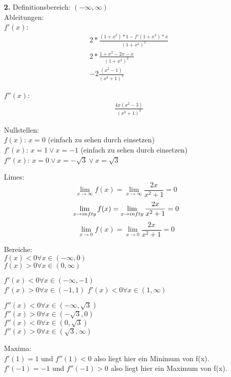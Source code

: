 \documentclass[a4paper]{scrartcl}
\title{\titleinfo}
\author{Elena Noll, Sven-Hendrik Haase, Arne Struck}
\date{\today}
\begin{document}
\maketitle

\begin{enumerate}

\item[\textbf{2.}]
Definitionsbereich: \((-\infty,\infty)\)\\
Ableitungen:\\

\(f'(x)\):
\begin{align}
&2*\frac {(1+x^2)*1-f'(1+x^2)*x} {(1+x^2)^2}\\
&2*\frac {1+x^2-2x-x} {(1+x^2)^2}\\
&-2\frac {(x^2-1)} {(x^2+1)^2}
\end{align}

\(f''(x)\):
\begin{align}
&\frac {4x(x^2-3)} {(x^2+1)^3}
\end{align}

Nullstellen:\\
\(f(x)\): \(x = 0\) (einfach zu sehen durch einsetzen)\\
\(f'(x)\): \(x = 1 \vee x = -1\) (einfach zu sehen durch einsetzen)\\
\(f''(x)\): \(x = 0 \vee x = -\sqrt 3 \vee x = \sqrt 3\)

Limes:\\
\[\lim_{x \to \infty} f(x) = \lim_{x \to \infty} \frac {2x} {x^2+1} = 0\]
\[\lim_{x \to \-infty} f(x) = \lim_{x \to \-infty} \frac {2x} {x^2+1} = 0\]
\[\lim_{x \to 0} f(x) = \lim_{x \to 0} \frac {2x} {x^2+1} = 0\]

Bereiche:\\
\(f(x) < 0 \forall x \in (-\infty,0)\)\\
\(f(x) > 0 \forall x \in (0,\infty)\)

\(f'(x) < 0 \forall x \in (-\infty,-1)\)\\
\(f'(x) > 0 \forall x \in (-1,1)\)
\(f'(x) < 0 \forall x \in (1,\infty)\)


\(f''(x) < 0 \forall x \in (-\infty,\sqrt 3)\)\\
\(f''(x) > 0 \forall x \in (-\sqrt 3,0)\)\\
\(f''(x) < 0 \forall x \in (0, \sqrt 3)\)\\
\(f''(x) > 0 \forall x \in (\sqrt 3, \infty)\)

Maxima:\\
\(f'(1) = 1\) und \(f''(1) < 0\) also liegt hier ein Minimum von f(x).\\
\(f'(-1) = -1\) und \(f''(-1) > 0\) also liegt hier ein Maximum von f(x).


\end{enumerate}
\end{document}
